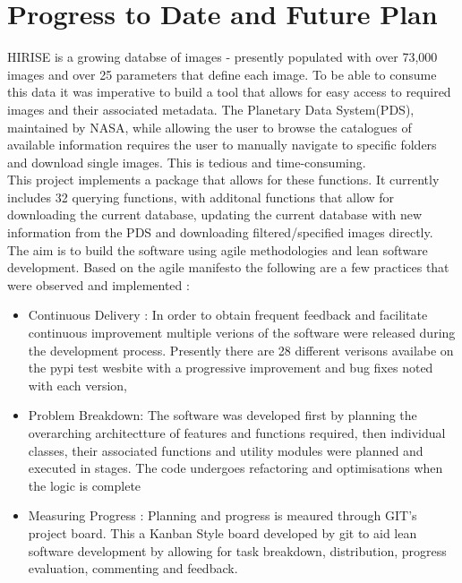 \documentclass[project-plan]{report-template}
\begin{document}
\section{Progress to Date and Future Plan}
 HIRISE is a growing databse of images - presently populated with over 73,000 images and over 25 parameters that define each image. To be able to consume this data it was imperative to build a tool that allows for easy access to required images and their associated metadata. The Planetary Data System(PDS), maintained by NASA, while allowing the user to browse the catalogues of available information requires the user to manually navigate to specific folders and download single images. This is tedious and time-consuming. \\
 This project implements a package that allows for these functions. It currently includes 32 querying functions, with additonal functions that allow for downloading the current database, updating the current database with new information from the PDS and downloading filtered/specified images directly.\\
 The aim is to build the software using agile methodologies and lean software development. Based on the agile manifesto the following are a few practices that were observed and implemented : \\
 \begin{itemize}
    \item Continuous Delivery : In order to obtain frequent feedback and facilitate continuous improvement multiple verions of the software were released during the development process. Presently there are 28 different verisons availabe on the pypi test wesbite with a progressive improvement and bug fixes noted with each version,
    \item Problem Breakdown: The software was developed first by planning the overarching architectture of features and functions required, then  individual classes, their associated functions and utility modules were planned and executed in stages. The code undergoes refactoring and optimisations when the logic is complete
    \item Measuring Progress : Planning and progress is meaured through GIT's project board. This a Kanban Style board developed by git to aid lean software development by allowing for task breakdown, distribution, progress evaluation, commenting  and feedback.
 \end{itemize}
\end{document}
